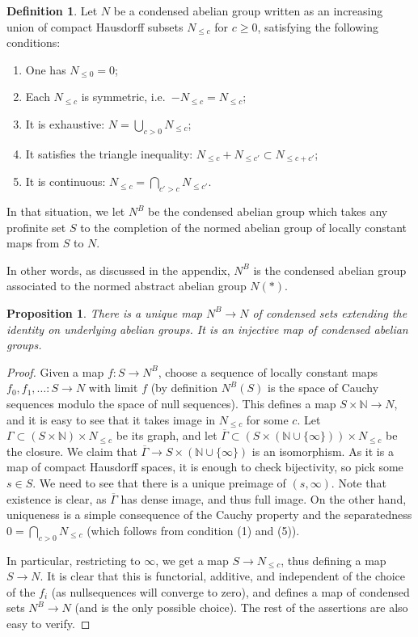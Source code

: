 \documentclass[11pt]{amsbook}
\numberwithin{equation}{section}
\numberwithin{theorem}{section}
\newtheorem{proposition}[theorem]{Proposition}
\theoremstyle{definition}
\newtheorem{definition}[theorem]{Definition}
\begin{document}
\begin{definition} Let $N$ be a condensed abelian group written as an increasing union of compact Hausdorff subsets $N_{\leq c}$ for $c\geq 0$, satisfying the following conditions:
\begin{enumerate}
\item One has $N_{\leq 0} = 0$;
\item Each $N_{\leq c}$ is symmetric, i.e.~$-N_{\leq c}=N_{\leq c}$;
\item It is exhaustive: $N=\bigcup_{c>0} N_{\leq c}$;
\item It satisfies the triangle inequality: $N_{\leq c}+N_{\leq c'}\subset N_{\leq c+c'}$;
\item It is continuous: $N_{\leq c}=\bigcap_{c'>c} N_{\leq c'}$.
\end{enumerate}
In that situation, we let $N^B$ be the condensed abelian group which takes any profinite set $S$ to the completion of the normed abelian group of locally constant maps from $S$ to $N$.
\end{definition}

In other words, as discussed in the appendix, $N^B$ is the condensed abelian group associated to the normed abstract abelian group $N(\ast)$.

\begin{proposition}\label{prop:passingtobanach} There is a unique map $N^B\to N$ of condensed sets extending the identity on underlying abelian groups. It is an injective map of condensed abelian groups.
\end{proposition}

\begin{proof} Given a map $f: S\to N^B$, choose a sequence of locally constant maps $f_0,f_1,\ldots: S\to N$ with limit $f$ (by definition $N^B(S)$ is the space of Cauchy sequences modulo the space of null sequences). This defines a map $S\times \mathbb N\to N$, and it is easy to see that it takes image in $N_{\leq c}$ for some $c$. Let $\Gamma\subset (S\times \mathbb N)\times N_{\leq c}$ be its graph, and let $\overline{\Gamma}\subset (S\times (\mathbb N\cup \{\infty\}))\times N_{\leq c}$ be the closure. We claim that $\overline{\Gamma}\to S\times (\mathbb N\cup\{\infty\})$ is an isomorphism. As it is a map of compact Hausdorff spaces, it is enough to check bijectivity, so pick some $s\in S$. We need to see that there is a unique preimage of $(s,\infty)$. Note that existence is clear, as $\overline{\Gamma}$ has dense image, and thus full image. On the other hand, uniqueness is a simple consequence of the Cauchy property and the separatedness $0=\bigcap_{c>0} N_{\leq c}$ (which follows from condition (1) and (5)).

In particular, restricting to $\infty$, we get a map $S\to N_{\leq c}$, thus defining a map $S\to N$. It is clear that this is functorial, additive, and independent of the choice of the $f_i$ (as nullsequences will converge to zero), and defines a map of condensed sets $N^B\to N$ (and is the only possible choice). The rest of the assertions are also easy to verify.
\end{proof}
\end{document}
